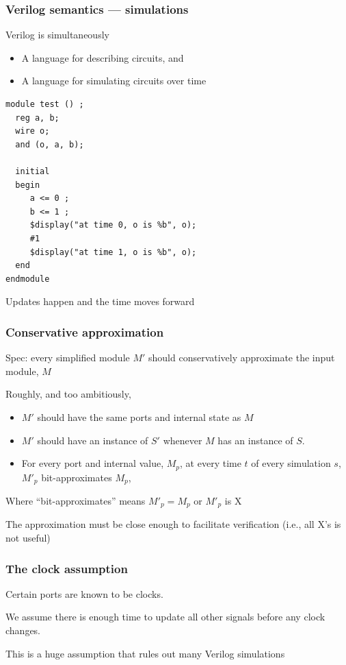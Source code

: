 \documentclass[mathserif]{beamer}
\newcommand{\Highlight}[1]{{\color{Highlight}#1}}
\begin{document}
\begin{frame}[fragile]
\frametitle{Verilog semantics --- simulations}

Verilog is simultaneously
\begin{itemize}
\item A language for \Highlight{describing} circuits, and
\item A language for \Highlight{simulating} circuits over time
\end{itemize}

{\small
\begin{verbatim}
module test () ;
  reg a, b;
  wire o;
  and (o, a, b);

  initial
  begin
     a <= 0 ;
     b <= 1 ;
     $display("at time 0, o is %b", o);
     #1
     $display("at time 1, o is %b", o);
  end
endmodule
\end{verbatim}}
\bigskip

Updates happen and the time moves forward

\end{frame}

\begin{frame}
\frametitle{Conservative approximation}

Spec: every simplified module $M'$ should \Highlight{conservatively approximate} the input module, $M$

\bigskip

Roughly, and too ambitiously,

\begin{itemize}
\item $M'$ should have the same ports and internal state as $M$
\item $M'$ should have an instance of $S'$ whenever $M$ has an instance of $S$.
\item For every port and internal value, $M_p$, at every time $t$ of every simulation $s$, 
       $M'_p$ bit-approximates $M_p$,
\end{itemize}

Where ``bit-approximates'' means $M'_p = M_p$ or $M'_p$ is X

\bigskip

The approximation must be close enough to facilitate verification (i.e., all X's is not useful)
\end{frame}


\begin{frame}
\frametitle{The clock assumption}

Certain ports are known to be \Highlight{clocks}.

\bigskip

We assume there is enough time to update all other signals before any clock changes.

\bigskip

This is a huge assumption that rules out many Verilog simulations


\end{frame}
\end{document}

